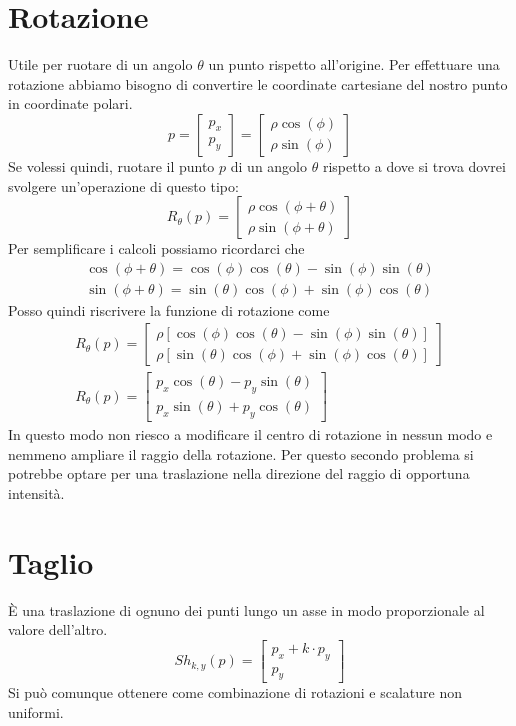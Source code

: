 \section{Rotazione}
Utile per ruotare di un angolo $\theta$ un punto rispetto all'origine. Per
effettuare una rotazione abbiamo bisogno di convertire le coordinate cartesiane del
nostro punto in coordinate polari.
\[
	p = \begin{bmatrix}
		p_x \\ p_y
	\end{bmatrix} =
	\begin{bmatrix}
		\rho \cos(\phi) \\
		\rho \sin(\phi)
	\end{bmatrix}\]
Se volessi quindi, ruotare il punto $p$ di un angolo $\theta$ rispetto a dove si trova
dovrei svolgere un'operazione di questo tipo:
\[
	R_\theta(p) =
	\begin{bmatrix}
		\rho \cos(\phi + \theta) \\
		\rho \sin(\phi + \theta)
	\end{bmatrix}
\]
Per semplificare i calcoli possiamo ricordarci che
\begin{gather*}
	\cos(\phi + \theta) = \cos(\phi) \cos(\theta) - \sin(\phi) \sin(\theta) \\
	\sin(\phi + \theta) = \sin(\theta) \cos(\phi) + \sin(\phi) \cos(\theta)
\end{gather*}
Posso quindi riscrivere la funzione di rotazione come
\begin{gather*}
	R_\theta(p) =
	\begin{bmatrix}
		\rho [ \cos(\phi) \cos(\theta) - \sin(\phi) \sin(\theta) ] \\
		\rho [ \sin(\theta) \cos(\phi) + \sin(\phi) \cos(\theta) ]
	\end{bmatrix} \\
	R_\theta(p) = \begin{bmatrix}
		p_x \cos(\theta) - p_y \sin(\theta) \\
		p_x \sin(\theta) + p_y \cos(\theta)
	\end{bmatrix}
\end{gather*}
In questo modo non riesco a modificare il centro di rotazione in nessun modo e nemmeno
ampliare il raggio della rotazione. Per questo secondo problema si potrebbe optare
per una traslazione nella direzione del raggio di opportuna intensit\`a.

\section{Taglio}
\`E una traslazione di ognuno dei punti lungo un asse in modo proporzionale al valore
dell'altro.
\[
	Sh_{k, y}(p) =
	\begin{bmatrix}
		p_x + k \cdot p_y \\
		p_y
	\end{bmatrix}
\]
Si pu\`o comunque ottenere come combinazione di rotazioni e scalature non uniformi.

